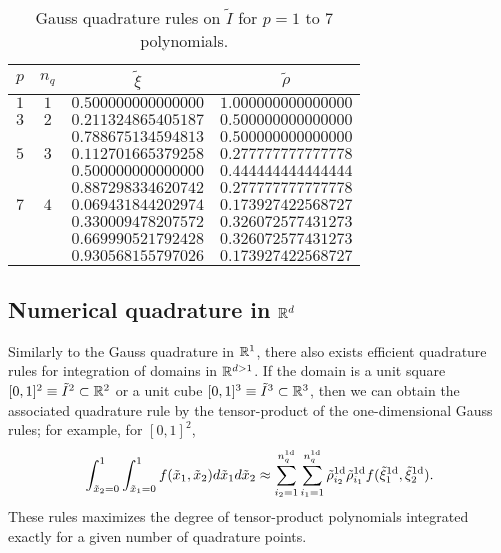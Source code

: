 \begin{table}
  \centering
  \begin{tabular}{cccc}
    $p$ & $n_q$ & $\tilde \xi$ & $\tilde \rho$ \\
    \hline
    $1$ & $1$ & $0.500000000000000$ & $1.000000000000000$ \\
    \hline
    $3$ & $2$ & $0.211324865405187$ & $0.500000000000000$ \\ 
    & & $0.788675134594813$ & $0.500000000000000$ \\
    \hline
    $5$ & $3$ & $0.112701665379258$ & $0.277777777777778$ \\ 
     & & $0.500000000000000$ & $0.444444444444444$ \\ 
     & & $0.887298334620742$ & $0.277777777777778$ \\
    \hline
    $7$ & $4$ & $0.069431844202974$ & $0.173927422568727$ \\ 
    & & $0.330009478207572$ & $0.326072577431273$ \\ 
    & & $0.669990521792428$ & $0.326072577431273$ \\ 
    & & $0.930568155797026$ & $0.173927422568727$ 
  \end{tabular}
  \caption{Gauss quadrature rules on $\tilde I$ for $p = 1$ to $7$ polynomials. \label{tb:fe_impl_gauss}}
\end{table}

\subsection{Numerical quadrature in $\mathbb{R}^d$}
\label{sec:fe_quad_nd}
Similarly to the Gauss quadrature in $\mathbb{R}^1$, there also exists efficient quadrature rules for integration of domains in $\mathbb{R}^{d > 1}$.  If the domain is a unit square $[0,1]^2 \equiv \tilde I^2 \subset \mathbb{R}^2$ or a unit cube $[0,1]^3 \equiv \tilde I^3 \subset \mathbb{R}^3$, then we can obtain the associated quadrature rule by the tensor-product of the one-dimensional Gauss rules; for example, for $[0,1]^2$, 
\begin{equation*}
  \int_{\tilde x_2=0}^1 \int_{\tilde x_1=0}^1 f(\tilde x_1,\tilde x_2) d\tilde x_1 d\tilde x_2
  \approx \sum_{i_2 = 1}^{n_q^{\rm 1d}} \sum_{i_1 = 1}^{n_q^{\rm 1d}} \tilde \rho_{i_2}^{\rm 1d} \tilde \rho_{i_1}^{\rm 1d} f(\tilde \xi_1^{\rm 1d}, \tilde \xi_2^{\rm 1d}).
\end{equation*}
These rules maximizes the degree of tensor-product polynomials integrated exactly for a given number of quadrature points.

